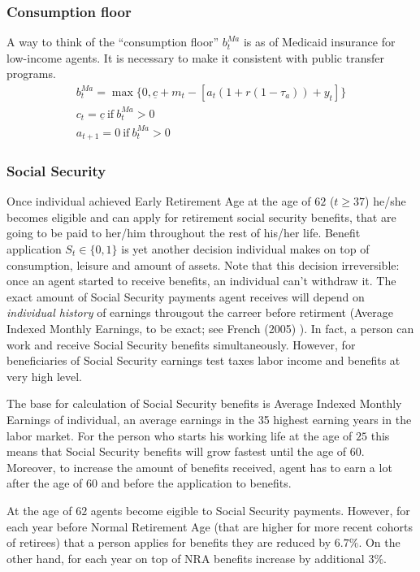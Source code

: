 \documentclass[
10pt, %
a4paper, %
oneside, %
headinclude,footinclude, %
BCOR5mm, %
]{scrartcl}
\begin{document}
\subsubsection{Consumption floor}
A way to think of the ``consumption floor'' $b_t^{Ma}$ is as of Medicaid insurance for low-income agents. It is necessary to make it consistent with public transfer programs.
\begin{eqnarray*}
b_t^{Ma} = \max\{0,\underline{c}+m_t - [a_t(1+r(1-\tau_a)) +y_t]\} \\
c_t = \underline{c} \ \text{if} \ b_t^{Ma} > 0  \\
a_{t+1} = 0 \ \text{if} \ b_t^{Ma} > 0  
\end{eqnarray*}

\subsubsection{Social Security}
Once individual achieved Early Retirement Age at the age of $62$ ($t\ge37$) he/she becomes eligible and can apply for retirement social security benefits, that are going to be paid to her/him throughout the rest of his/her life. Benefit application $S_t\in\{0,1\}$ is yet another decision individual makes on top of consumption, leisure and amount of assets. Note that this decision irreversible: once an agent started to receive benefits, an individual can't withdraw it.
The exact amount of Social Security payments agent receives will depend on \emph{individual history} of earnings througout the carreer before retirment (Average Indexed Monthly Earnings, to be exact; see French (2005) \cite{French2005}). In fact, a person can work and receive Social Security benefits simultaneously. However, for beneficiaries of Social Security earnings test taxes labor income and benefits at very high level. 

The base for calculation of Social Security benefits is Average Indexed Monthly Earnings of individual, an average earnings in the 35 highest earning years in the labor market. For the person who starts his working life at the age of $25$ this means that Social Security benefits will grow fastest until the age of $60$. Moreover, to increase the amount of benefits received, agent has to earn a lot after the age of $60$ and before the application to benefits. 

At the age of $62$ agents become eigible to Social Security payments. However, for each year before Normal Retirement Age (that are higher for more recent cohorts of retirees) that a person applies for benefits they are reduced by $6.7\%$. On the other hand, for each year on top of NRA benefits increase by additional $3\%$.
\end{document}
